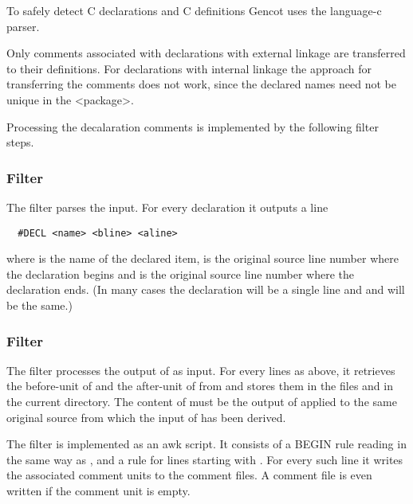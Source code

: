 To safely detect C declarations and C definitions Gencot uses the language-c parser. 

Only comments associated with declarations with external linkage are transferred to their definitions. For declarations
with internal linkage the approach for transferring the comments does not work, since the declared names need not be
unique in the <package>.

Processing the decalaration comments is implemented by the following filter steps. 

\subsubsection{Filter }

The filter  parses the input. For every declaration it outputs a line
\begin{verbatim}
  #DECL <name> <bline> <aline>
\end{verbatim}
where  is the name of the declared item,  is the original source line 
number where the declaration begins and  is
the original source line number where the declaration ends. (In many cases the declaration will be
a single line and  and  will be the same.)

\subsubsection{Filter }

The filter  processes the output of  as input. For every
lines as above, it retrieves the before-unit of  and the after-unit of  from 
and stores them in the files  and  in the
current directory. The content of  must be the output of  applied to the same
original source from which the input of  has been derived.

The filter is implemented as an awk script. It consists of a 
BEGIN rule reading  in the same way as , and a rule for lines starting with 
. For every such line it writes the associated comment units to the comment files. A comment
file is even written if the comment unit is empty.

